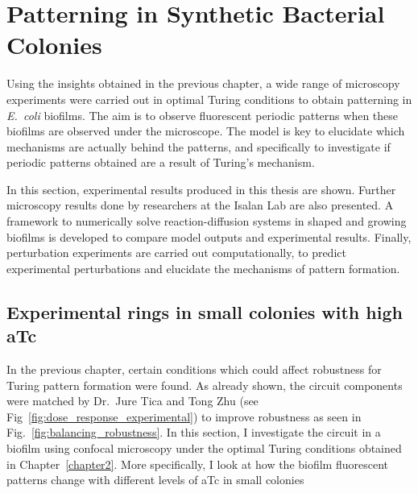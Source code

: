 \chapter{Patterning in Synthetic Bacterial Colonies} \label{chapter3}
Using the insights obtained in the previous chapter, a wide range of microscopy experiments were carried out in optimal Turing conditions to obtain patterning in \textit{E.~coli} biofilms.
The aim is to observe fluorescent periodic patterns when these biofilms are observed under the microscope.
The model is key to elucidate which mechanisms are actually behind the patterns, and specifically to investigate if periodic patterns obtained are a result of Turing's mechanism.

In this section, experimental results produced in this thesis are shown.
Further microscopy results done by researchers at the Isalan Lab are also presented.
A framework to numerically solve reaction-diffusion systems in shaped and growing biofilms is developed to compare model outputs and experimental results.
Finally, perturbation experiments are carried out computationally, to predict experimental perturbations and elucidate the mechanisms of pattern formation.

\section{Experimental rings in small colonies with high aTc}\label{Rings in small colonies with high aTc}
In the previous chapter, certain conditions which could affect robustness for Turing pattern formation were found.
As already shown, the circuit components were matched by Dr.~Jure Tica and Tong Zhu (see Fig~\ref{fig:dose_response_experimental}) to improve robustness as seen in Fig.~\ref{fig:balancing_robustness}.
In this section, I investigate the circuit in a biofilm using confocal microscopy under the optimal Turing conditions obtained in Chapter~\ref{chapter2}.
More specifically, I look at how the biofilm fluorescent patterns change with different levels of aTc in small colonies

